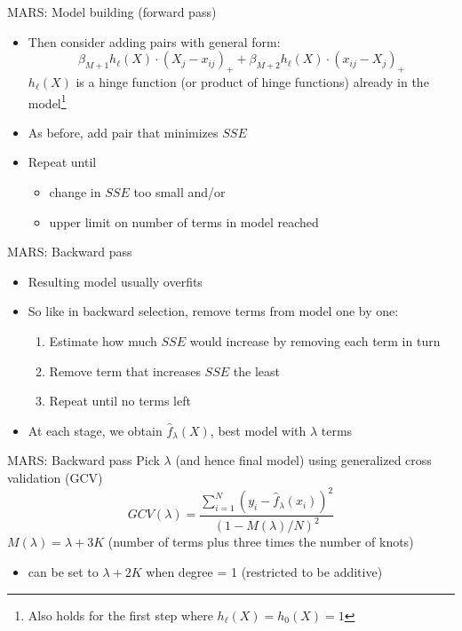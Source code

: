 \documentclass{beamer}
\begin{document}
\begin{frame}{MARS: Model building (forward pass)}
  \begin{itemize}[<+->]
    \item Then consider adding pairs with general form:
  \begin{equation*} \label{eq:gen-pairs-add}
    \beta_{M + 1} h_{\ell}(X) \cdot (X_{j} - x_{ij})_{+} + \beta_{M + 2} h_{\ell}(X) \cdot (x_{ij} - X_{j})_{+}
  \end{equation*}
  $h_{\ell}(X)$ is a hinge function (or product of hinge functions) already in the model\footnote{Also holds for the first step where $h_{\ell}(X) = h_{0}(X) = 1$}
  \item As before, add pair that minimizes $SSE$
  \item Repeat until 
  \begin{itemize}
    \item change in $SSE$ too small and/or
    \item upper limit on number of terms in model reached
  \end{itemize}
  \end{itemize}
\end{frame}

\begin{frame}{MARS: Backward pass}
  \begin{itemize}[<+->]
    \item Resulting model usually overfits
    \item So like in backward selection, remove terms from model one by one:
    \begin{enumerate}
      \item Estimate how much $SSE$ would increase by removing each term in turn
      \item Remove term that increases $SSE$ the least
      \item Repeat until no terms left
    \end{enumerate}
    \item At each stage, we obtain $\hat{f}_{\lambda}(X)$, best model with $\lambda$ terms
  \end{itemize}

\end{frame}

\begin{frame}{MARS: Backward pass}
Pick $\lambda$ (and hence final model) using generalized cross validation (GCV) 
    \begin{equation*}
    GCV(\lambda) =
      \frac{
        \sum_{i = 1}^{N}(y_{i} - \hat{f}_{\lambda}(x_{i}))^2
      }{
        (1 - M(\lambda)/N)^2
      }
  \end{equation*}
  $M(\lambda) = \lambda + 3K$ (number of terms plus three times the number of knots)
  \begin{itemize}
    \item<+-> can be set to $\lambda + 2K$ when degree = 1 (restricted to be additive)
  \end{itemize}

\end{frame}
\end{document}
